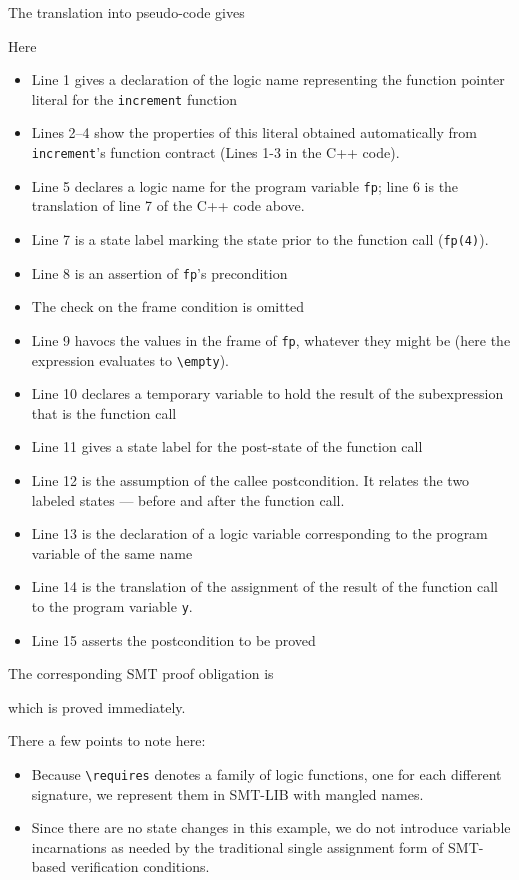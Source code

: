 {The translation into pseudo-code gives


Here
\begin{itemize}[noitemsep,nolistsep]
	\item Line 1 gives a declaration of the logic name representing 
	the function pointer literal for the \lstinline|increment| function
	\item Lines 2--4 show the properties of this literal obtained
	automatically from \lstinline|increment|'s function contract
	(Lines 1-3 in the C++ code).
	\item Line 5 declares a logic name for the program variable 
	\lstinline|fp|; line 6 is the translation of line 7 of the C++ code above.
	\item Line 7 is a state label marking the state prior to the 
	function call (\lstinline|fp(4)|).
	\item Line 8 is an assertion of \lstinline|fp|'s precondition
	\item The check on the frame condition is omitted
	\item Line 9 havocs the values in the frame of \lstinline|fp|,
	whatever they might be (here the expression evaluates to 
	\lstinline|\empty|).
	\item Line 10 declares a temporary variable to hold the result of
	the subexpression that is the function call
	\item Line 11 gives a state label for the post-state of the function call
	\item Line 12 is the assumption of the callee postcondition. It relates the two labeled states --- before and after the function call.
	\item Line 13 is the declaration of a logic variable corresponding 
	to the program variable of the same name
	\item Line 14 is the translation of the assignment of the result of
	the function call to the program variable \lstinline|y|.
	\item Line 15 asserts the postcondition to be proved
\end{itemize}

The corresponding SMT proof obligation is

which is proved immediately.

There a few points to note here:
\begin{itemize}
	\item Because \lstinline|\requires| denotes a family of logic functions, one for each different signature, we represent them in SMT-LIB with mangled names.
	\item Since there are no state changes in this example, we do not introduce variable incarnations as needed by the traditional 
	single assignment form of SMT-based verification conditions.
\end{itemize}

}
